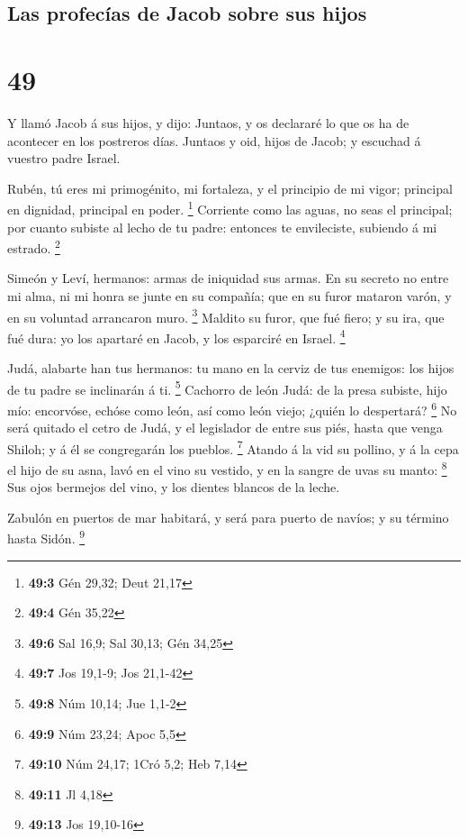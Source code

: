 \hypertarget{las-profecuxedas-de-jacob-sobre-sus-hijos}{%
\subsection{Las profecías de Jacob sobre sus
hijos}\label{las-profecuxedas-de-jacob-sobre-sus-hijos}}

\hypertarget{section-48}{%
\section{49}\label{section-48}}

 Y llamó Jacob á sus hijos, y dijo: Juntaos, y os declararé
lo que os ha de acontecer en los postreros días.  Juntaos y
oid, hijos de Jacob; y escuchad á vuestro padre Israel.

 Rubén, tú eres mi primogénito, mi fortaleza, y el principio
de mi vigor; principal en dignidad, principal en poder. \footnote{\textbf{49:3}
  Gén 29,32; Deut 21,17}  Corriente como las aguas, no seas
el principal; por cuanto subiste al lecho de tu padre: entonces te
envileciste, subiendo á mi estrado. \footnote{\textbf{49:4} Gén 35,22}

 Simeón y Leví, hermanos: armas de iniquidad sus armas.
 En su secreto no entre mi alma, ni mi honra se junte en su
compañía; que en su furor mataron varón, y en su voluntad arrancaron
muro. \footnote{\textbf{49:6} Sal 16,9; Sal 30,13; Gén 34,25}
 Maldito su furor, que fué fiero; y su ira, que fué dura: yo
los apartaré en Jacob, y los esparciré en Israel. \footnote{\textbf{49:7}
  Jos 19,1-9; Jos 21,1-42}

 Judá, alabarte han tus hermanos: tu mano en la cerviz de
tus enemigos: los hijos de tu padre se inclinarán á ti. \footnote{\textbf{49:8}
  Núm 10,14; Jue 1,1-2}  Cachorro de león Judá: de la presa
subiste, hijo mío: encorvóse, echóse como león, así como león viejo;
¿quién lo despertará? \footnote{\textbf{49:9} Núm 23,24; Apoc 5,5}
 No será quitado el cetro de Judá, y el legislador de entre
sus piés, hasta que venga Shiloh; y á él se congregarán los pueblos.
\footnote{\textbf{49:10} Núm 24,17; 1Cró 5,2; Heb 7,14} 
Atando á la vid su pollino, y á la cepa el hijo de su asna, lavó en el
vino su vestido, y en la sangre de uvas su manto: \footnote{\textbf{49:11}
  Jl 4,18}  Sus ojos bermejos del vino, y los dientes
blancos de la leche.

 Zabulón en puertos de mar habitará, y será para puerto de
navíos; y su término hasta Sidón. \footnote{\textbf{49:13} Jos 19,10-16}

